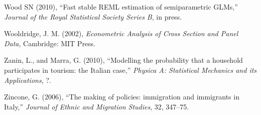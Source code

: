 \documentclass[10pt] {article}
\theoremstyle{definition}
\theoremstyle{plain}
\begin{document}
\begin{thebibliography}{99}
\bibitem{} Wood SN (2010), ``Fast stable REML estimation of semiparametric GLMs,'' \textit{Journal of the Royal Statistical Society Series B}, in press.

\bibitem{} Wooldridge, J. M. (2002), \textit{Econometric Analysis of Cross Section and Panel Data}, Cambridge: MIT Press.

\bibitem{} Zanin, L., and Marra, G. (2010), ``Modelling the probability that a household participates in tourism: the Italian case,'' \textit{Physica A: Statistical Mechanics and its Applications}, ?.

\bibitem{} Zincone, G. (2006), ``The making of policies: immigration and immigrants in Italy,'' \textit{Journal of Ethnic and Migration Studies}, 32, 347--75.


\end{thebibliography}
\end{document}
